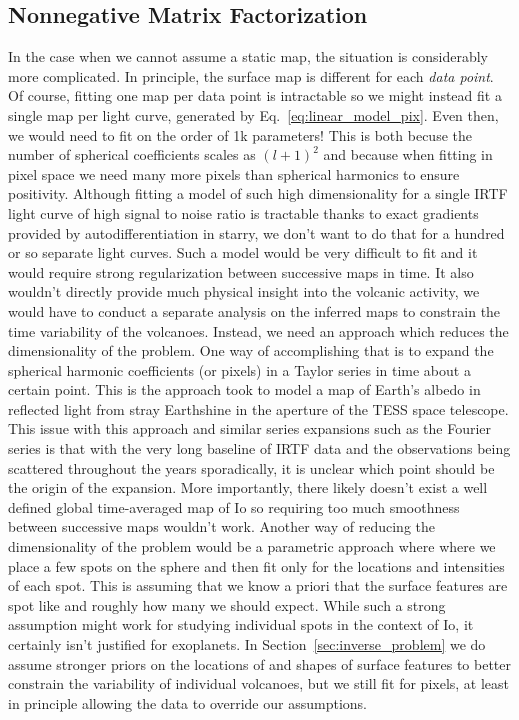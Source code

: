 \documentclass[modern]{aastex62}
\begin{document}
\subsection{Nonnegative Matrix Factorization}
\label{ssec:nmf}
In the case when we cannot assume a static map, the situation is considerably more complicated.
In principle, the surface map is different for each \emph{data point}.
Of course, fitting one map per data point is intractable so we might instead fit a single map per light curve, generated by Eq.~\ref{eq:linear_model_pix}.
Even then, we would need to fit on the order of 1k parameters!
This is both becuse the number of spherical coefficients scales as $(l+1)^2$ and because when fitting in pixel space we need many more pixels than spherical harmonics to ensure positivity.
Although fitting a model of such high dimensionality for a single IRTF light curve of high signal to noise ratio is tractable thanks to exact gradients provided by autodifferentiation in \textsf{starry}, we don't want to do that for a hundred or so separate light curves.
Such a model would be very difficult to fit and it would require strong regularization between successive maps in time.
It also wouldn't directly provide much physical insight into the volcanic activity, we would have to conduct a separate analysis on the inferred maps to constrain the time variability of the volcanoes.
Instead, we need an approach which reduces the dimensionality of the problem.
One way of accomplishing that is to expand the spherical harmonic coefficients (or pixels) in a Taylor series in time about a certain point.
This is the approach \cite{luger_tess_2019} took to model a map of Earth's albedo in reflected light from stray Earthshine in the aperture of the TESS space telescope.
This issue with this approach and similar series expansions such as the Fourier series is that with the very long baseline of IRTF data and the observations being scattered throughout the years sporadically, it is unclear which point should be the origin of the expansion.
More importantly, there likely doesn't exist a well defined global time-averaged map of Io so requiring too much smoothness between successive maps wouldn't work.
Another way of reducing the dimensionality of the problem would be a parametric approach where where we place a few spots on the sphere and then fit only for the locations and intensities of each spot.
This is assuming that we know a priori that the surface features are spot like and roughly how many we should expect.
While such a strong assumption might work for studying individual spots in the context of Io, it certainly isn't justified for exoplanets.
In Section~\ref{sec:inverse_problem} we do assume stronger priors on the locations of and shapes of surface features to better constrain the variability of individual volcanoes, but we still fit for pixels, at least in principle allowing the data to override our assumptions.
\end{document}
